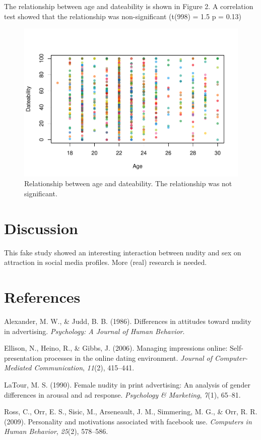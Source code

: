 \documentclass[english,floatsintext,man]{apa6}
\theoremstyle{definition}
\theoremstyle{definition}
\theoremstyle{remark}
\begin{document}
The relationship between age and dateability is shown in Figure 2. A
correlation test showed that the relationship was non-significant
(t(998) = 1.5 p = 0.13)

\begin{figure}[htbp]
\centering
\includegraphics{02-papaja-example-article-nathaniel-phillips_files/figure-latex/unnamed-chunk-7-1.pdf}
\caption{\label{fig:unnamed-chunk-7}Relationship between age and
dateability. The relationship was not significant.}
\end{figure}

\section{Discussion}\label{discussion}

This fake study showed an interesting interaction between nudity and sex
on attraction in social media profiles. More (real) research is needed.

\section{References}\label{references}

\setlength{\parindent}{-0.5in} \setlength{\leftskip}{0.5in}
\setlength{\parskip}{8pt}

\hypertarget{refs}{}
\hypertarget{ref-alexander1986differences}{}
Alexander, M. W., \& Judd, B. B. (1986). Differences in attitudes toward
nudity in advertising. \emph{Psychology: A Journal of Human Behavior}.

\hypertarget{ref-ellison2006managing}{}
Ellison, N., Heino, R., \& Gibbs, J. (2006). Managing impressions
online: Self-presentation processes in the online dating environment.
\emph{Journal of Computer-Mediated Communication}, \emph{11}(2),
415--441.

\hypertarget{ref-latour1990female}{}
LaTour, M. S. (1990). Female nudity in print advertising: An analysis of
gender differences in arousal and ad response. \emph{Psychology \&
Marketing}, \emph{7}(1), 65--81.

\hypertarget{ref-ross2009personality}{}
Ross, C., Orr, E. S., Sisic, M., Arseneault, J. M., Simmering, M. G., \&
Orr, R. R. (2009). Personality and motivations associated with facebook
use. \emph{Computers in Human Behavior}, \emph{25}(2), 578--586.
\end{document}
